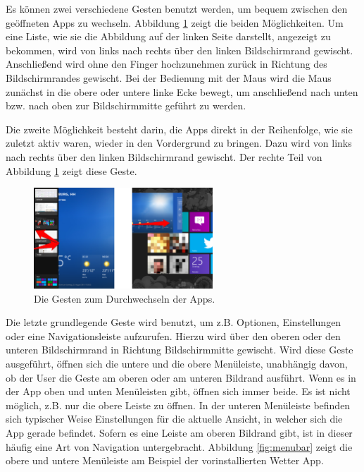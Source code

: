\documentclass[12pt,a4paper,bibtotoc,abstracton]{scrartcl}
\begin{document}
Es können zwei verschiedene Gesten benutzt werden, um bequem zwischen den geöffneten Apps zu wechseln. Abbildung \ref{fig:appschanging} zeigt die beiden Möglichkeiten. Um eine Liste, wie sie die Abbildung auf der linken Seite darstellt, angezeigt zu bekommen, wird von links nach rechts über den linken Bildschirmrand gewischt. Anschließend wird ohne den Finger hochzunehmen zurück in Richtung des Bildschirmrandes gewischt. Bei der Bedienung mit der Maus wird die Maus zunächst in die obere oder untere linke Ecke bewegt, um anschließend nach unten bzw. nach oben zur Bildschirmmitte geführt zu werden.

Die zweite Möglichkeit besteht darin, die Apps direkt in der Reihenfolge, wie sie zuletzt aktiv waren, wieder in den Vordergrund zu bringen. Dazu wird von links nach rechts über den linken Bildschirmrand gewischt. Der rechte Teil von Abbildung \ref{fig:appschanging} zeigt diese Geste.
 
\begin{figure}[h]	
	\centering
	\includegraphics[width=0.6\textwidth]{Bilder/Screenshots/windows8/apps_changing.png} 
	\caption{Die Gesten zum Durchwechseln der Apps.}
	\label{fig:appschanging}
\end{figure}  

Die letzte grundlegende Geste wird benutzt, um z.B. Optionen, Einstellungen oder eine Navigationsleiste aufzurufen. Hierzu wird über den oberen oder den unteren Bildschirmrand in Richtung Bildschirmmitte gewischt. Wird diese Geste ausgeführt, öffnen sich die untere und die obere Menüleiste, unabhängig davon, ob der User die Geste am oberen oder am unteren Bildrand ausführt. Wenn es in der App oben und unten Menüleisten gibt, öffnen sich immer beide. Es ist nicht möglich, z.B. nur die obere Leiste zu öffnen. In der unteren Menüleiste befinden sich typischer Weise Einstellungen für die aktuelle Ansicht, in welcher sich die App gerade befindet. Sofern es eine Leiste am oberen Bildrand gibt, ist in dieser häufig eine Art von Navigation untergebracht. Abbildung \ref{fig:menubar} zeigt die obere und untere Menüleiste am Beispiel der vorinstallierten Wetter App.
\end{document}
